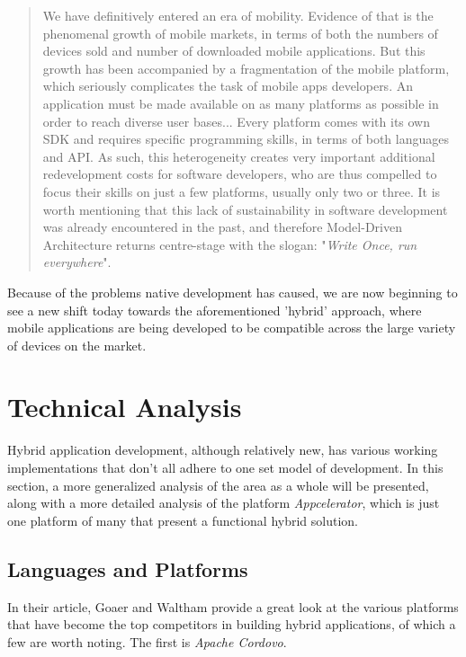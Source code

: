 \documentclass[11pt, twocolumn]{article}
\begin{document}
\begin{quote}
We have definitively entered an era of mobility.  Evidence of that is the phenomenal growth of mobile markets, in terms of both the numbers of devices sold and number of downloaded mobile applications.  But this growth has been accompanied by a fragmentation of the mobile platform, which seriously complicates the task of mobile apps developers.  An application must be made available on as many platforms as possible in order to reach diverse user bases... Every platform comes with its own SDK and requires specific programming skills, in terms of both languages and API.  As such, this heterogeneity creates very important additional redevelopment costs for software developers, who are thus compelled to focus their skills on just a few platforms, usually only two or three.  It is worth mentioning that this lack of sustainability in software development was already encountered in the past, and therefore Model-Driven Architecture returns centre-stage with the slogan: "{\it Write Once, run everywhere}".~\cite{Goaer2013}
\end{quote} 

Because of the problems native development has caused, we are now beginning to see a new shift today towards the aforementioned 'hybrid' approach, where mobile applications are being developed to be compatible across the large variety of devices on the market. ~\cite{Kolokolov2013} \\

\section{Technical Analysis}
Hybrid application development, although relatively new, has various working implementations that don't all adhere to one set model of development.  In this section, a more generalized analysis of the area as a whole will be presented, along with a more detailed analysis of the platform {\it Appcelerator}, which is just one platform of many that present a functional hybrid solution.

\subsection{Languages and Platforms}
In their article, Goaer and Waltham provide a great look at the various platforms that have become the top competitors in building hybrid applications, of which a few are worth noting.  The first is {\it Apache Cordovo}.\\
\end{document}
